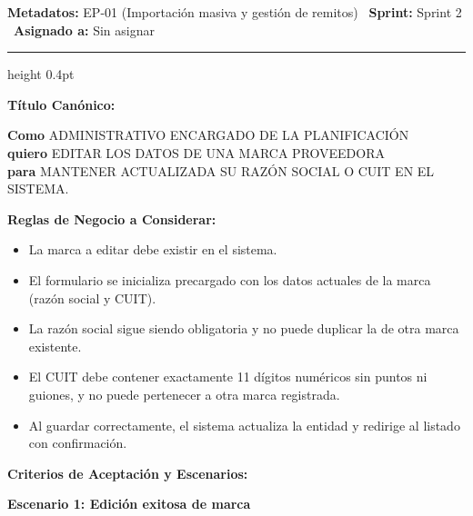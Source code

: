 \documentclass[a4paper,9pt]{article}
\begin{document}
\begin{tcolorbox}[hucard, title={\textbf{HU-241: EDITAR MARCA} \hfill \scriptsize \colorbox{slatestatus}{\textbf{\ Done\ }} \quad \colorbox{white}{\textcolor{primarydark}{\textbf{\ 3 pts\ }}}}]
\vspace{-1pt}
\noindent\textbf{\footnotesize Metadatos:} EP-01 (Importación masiva y gestión de remitos) \textbar\ \textbf{Sprint:} Sprint 2 \textbar\ \textbf{Asignado a:} Sin asignar\par\vspace{2pt}
\hrule height 0.4pt\par\vspace{3pt}
\noindent\textbf{\footnotesize Título Canónico:}\par\vspace{1pt}
{\small \textbf{Como} ADMINISTRATIVO ENCARGADO DE LA PLANIFICACIÓN \\ \textbf{quiero} EDITAR LOS DATOS DE UNA MARCA PROVEEDORA \\ \textbf{para} MANTENER ACTUALIZADA SU RAZÓN SOCIAL O CUIT EN EL SISTEMA.}\par\vspace{3pt}
\noindent\textbf{\footnotesize Reglas de Negocio a Considerar:}\par\vspace{1pt}
{\footnotesize
\begin{itemize}[leftmargin=12pt, nosep, itemsep=1.5pt, topsep=1pt]
\item La marca a editar debe existir en el sistema.
\item El formulario se inicializa precargado con los datos actuales de la marca (razón social y CUIT).
\item La razón social sigue siendo obligatoria y no puede duplicar la de otra marca existente.
\item El CUIT debe contener exactamente 11 dígitos numéricos sin puntos ni guiones, y no puede pertenecer a otra marca registrada.
\item Al guardar correctamente, el sistema actualiza la entidad y redirige al listado con confirmación.
\end{itemize}
}\par\vspace{3pt}
\noindent\textbf{\footnotesize Criterios de Aceptación y Escenarios:}\par\vspace{2pt}
{\footnotesize
\noindent\textbf{\textcolor{secondarydark}{Escenario 1:  Edición exitosa de marca}}\par\vspace{1pt}
}
\end{tcolorbox}
\end{document}
